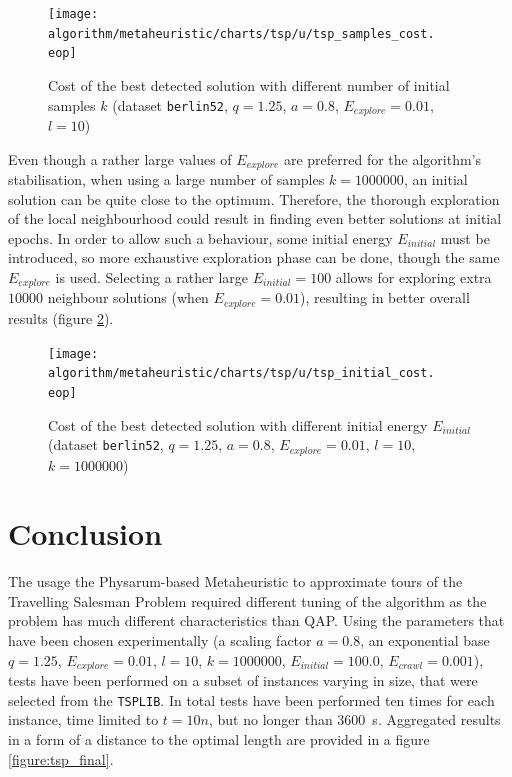 \documentclass[english,a4paper,twoside]{ppfcmthesis}
\begin{document}
\begin{figure}
  \centering

  \texttt{[image: algorithm/metaheuristic/charts/tsp/u/tsp\_samples\_cost.\\eop]}

  \caption{Cost of the best detected solution with different number of initial samples $k$ (dataset \texttt{berlin52}, $q=1.25$, $a=0.8$, $E_{explore}=0.01$, $l=10$)}
  \label{figure:tsp_samples_cost}
\end{figure}

Even though a rather large values of $E_{explore}$ are preferred for the algorithm's stabilisation, when using a large number of samples $k=1000000$, an initial solution can be quite close to the optimum. Therefore, the thorough exploration of the local neighbourhood could result in finding even better solutions at initial epochs. In order to allow such a behaviour, some initial energy $E_{initial}$ must be introduced, so more exhaustive exploration phase can be done, though the same $E_{explore}$ is used. Selecting a rather large $E_{initial}=100$ allows for exploring extra $10000$ neighbour solutions (when $E_{explore}=0.01$), resulting in better overall results (figure \ref{figure:tsp_initial_cost}).

\begin{figure}
  \centering

  \texttt{[image: algorithm/metaheuristic/charts/tsp/u/tsp\_initial\_cost.\\eop]}

  \caption{Cost of the best detected solution with different initial energy $E_{initial}$ (dataset \texttt{berlin52}, $q=1.25$, $a=0.8$, $E_{explore}=0.01$, $l=10$, $k=1000000$)}
  \label{figure:tsp_initial_cost}
\end{figure}

\section*{Conclusion}

The usage the Physarum-based Metaheuristic to approximate tours of the Travelling Salesman Problem required different tuning of the algorithm as the problem has much different characteristics than QAP. Using the parameters that have been chosen experimentally (a scaling factor $a=0.8$, an exponential base $q=1.25$, $E_{explore}=0.01$, $l=10$, $k=1000000$, $E_{initial}=100.0$, $E_{crawl}=0.001$), tests have been performed on a subset of instances varying in size, that were selected from the \texttt{TSPLIB}. In total tests have been performed ten times for each instance, time limited to $t=10n$, but no longer than 3600~s. Aggregated results in a form of a distance to the optimal length are provided in a figure \ref{figure:tsp_final}.
\end{document}
